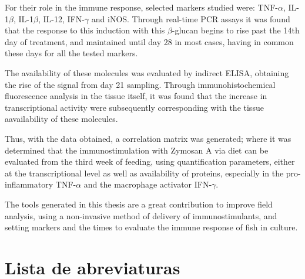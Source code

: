\documentclass[12pt,letterpaper,oneside]{scrbook}
\begin{document}
For their role in the immune response, selected markers studied were:
TNF-\(\alpha\), IL-1\(\beta\), IL-1\(\beta\), IL-12, IFN-\(\gamma\) and
iNOS. Through real-time PCR assays it was found that the response to
this induction with this \(\beta\)-glucan begins to rise past the 14th
day of treatment, and maintained until day 28 in most cases, having in
common these days for all the tested markers.

The availability of these molecules was evaluated by indirect ELISA,
obtaining the rise of the signal from day 21 sampling. Through
immunohistochemical fluorescence analysis in the tissue itself, it was
found that the increase in transcriptional activity were subsequently
corresponding with the tissue aavailability of these molecules.

Thus, with the data obtained, a correlation matrix was generated; where
it was determined that the immunostimulation with Zymosan A via diet can
be evaluated from the third week of feeding, using quantification
parameters, either at the transcriptional level as well as availability
of proteins, especially in the pro-inflammatory TNF-\(\alpha\) and the
macrophage activator IFN-\(\gamma\).

The tools generated in this thesis are a great contribution to improve
field analysis, using a non-invasive method of delivery of
immunostimulants, and setting markers and the times to evaluate the
immune response of fish in culture. \tableofcontents
\clearpage
\cleardoublepage
\chapter{Lista de abreviaturas}
\end{document}
